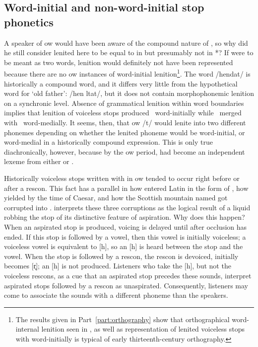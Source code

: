\subsection{Word-initial and non-word-initial stop phonetics}
\label{sec:word-initial-non}
A speaker of \gls{ow} would have been aware of the compound nature of , so why did he still consider lenited  here to be equal to  in  but presumably not in *? If  were to be meant  as two words, lenition would definitely not have been represented because there are no \gls{ow} instances of word-initial lenition\footnote{The results given in Part~\ref{part:orthography} show that orthographical word-internal lenition seen in , as well as representation of lenited voiceless stops with  word-initially is typical of early thirteenth-century orthography.}.  The word  /hendat/ is historically  a compound word, and it differs very little from the hypothetical word for `old father':  /hen \gls{l}tat/, but it does not contain morphophonemic lenition on a synchronic level. Absence of grammatical lenition within word boundaries implies that lenition of voiceless stops produced \lT\ word-initially while \lT\  merged with \xD\ word-medially. It seems, then, that \gls{ow} /t/ would lenite into two different phonemes depending on whether the lenited phoneme would be word-initial, or word-medial in a historically compound expression. This is only true diachronically, however, because by the \gls{ow} period,  had become an independent lexeme from either  or . 

Historically voiceless stops written with  in \gls{ow} tended to occur right before or after a \gls{rescon}. This fact has a parallel in how  entered Latin in the form of , how  yielded  by the time of Caesar, and how the Scottish mountain named  got corrupted into . \textcite[§~25]{koch_*cothairche_1990} interprets these three corruptions as the logical result of a liquid robbing the stop of its distinctive feature of aspiration. Why does this happen? When an aspirated stop is produced, voicing is delayed until after occlusion has ended. If this stop is followed by a vowel, then this vowel is initially voiceless; a voiceless vowel is equivalent to [h], so an [h] is heard between the stop and the vowel. When the stop is followed by a \gls{rescon}, the \gls{rescon} is devoiced, \eg [r] initially becomes [r̥]; an [h] is not produced. Listeners who take the [h], but not the voiceless \gls{rescon}s, as a cue that an aspirated stop precedes these sounds, interpret aspirated stops followed by a \gls{rescon} as unaspirated. Consequently, listeners may come to associate the sounds with a different \gls{phoneme} than the speakers.


